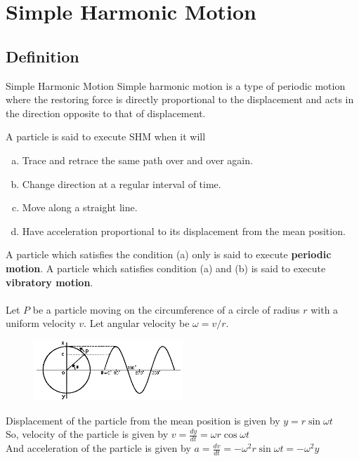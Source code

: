 \documentclass[12pt]{article}
\begin{document}
\section{Simple Harmonic Motion}
\subsection{Definition}

\begin{definition}{Simple Harmonic Motion}{}
    Simple harmonic motion is a type of periodic motion where the restoring force is directly proportional to the displacement and acts in the direction opposite to that of displacement.
\end{definition}

A particle is said to execute SHM when it will
\begin{enumerate}[(a)]
    \item Trace and retrace the same path over and over again.
    \item Change direction at a regular interval of time.
    \item Move along a straight line.
    \item Have acceleration proportional to its displacement from the mean position.
\end{enumerate}

A particle which satisfies the condition (a) only is said to execute \textbf{periodic motion}. A particle which satisfies condition (a) and (b) is said to execute \textbf{vibratory motion}. \\~\\

Let $P$ be a particle moving on the circumference of a circle of radius $r$ with a uniform velocity $v$. Let angular velocity be $\omega = v/r$.

\begin{figure}[htpb]
    \centering
    \includegraphics[width=0.5\textwidth]{1.png}
\end{figure}

\vspace{20pt}
Displacement of the particle from the mean position is given by $\displaystyle y = r \sin{\omega t}$\\
So, velocity of the particle is given by $\displaystyle v = \frac{dy}{dt} = \omega r \cos{\omega t}$\\
And acceleration of the particle is given by $\displaystyle a = \frac{dv}{dt} = -\omega^2 r \sin{\omega t} = -\omega^2 y$
\end{document}
